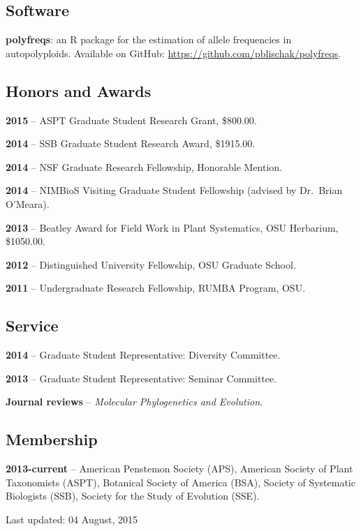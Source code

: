 \documentclass[]{article}
\begin{document}
\subsection{\texorpdfstring{\textbf{Software}}{Software}}\label{software}

\textbf{polyfreqs}: an R package for the estimation of allele
frequencies in autopolyploids. Available on GitHub:
\href{https://github.com/pblischak/polyfreqs}{\url{https://github.com/pblischak/polyfreqs}}.

\subsection{\texorpdfstring{\textbf{Honors and
Awards}}{Honors and Awards}}\label{honors-and-awards}

\textbf{2015} -- ASPT Graduate Student Research Grant, \$800.00.

\textbf{2014} -- SSB Graduate Student Research Award, \$1915.00.

\textbf{2014} -- NSF Graduate Research Fellowship, Honorable Mention.

\textbf{2014} -- NIMBioS Visiting Graduate Student Fellowship (advised
by Dr.~Brian O'Meara).

\textbf{2013} -- Beatley Award for Field Work in Plant Systematics, OSU
Herbarium, \$1050.00.

\textbf{2012} -- Distinguished University Fellowship, OSU Graduate
School.

\textbf{2011} -- Undergraduate Research Fellowship, RUMBA Program, OSU.

\subsection{\texorpdfstring{\textbf{Service}}{Service}}\label{service}

\textbf{2014} -- Graduate Student Representative: Diversity Committee.

\textbf{2013} -- Graduate Student Representative: Seminar Committee.

\textbf{Journal reviews} -- \emph{Molecular Phylogenetics and
Evolution}.

\subsection{\texorpdfstring{\textbf{Membership}}{Membership}}\label{membership}

\textbf{2013-current} -- American Penstemon Society (APS), American
Society of Plant Taxonomists (ASPT), Botanical Society of America (BSA),
Society of Systematic Biologists (SSB), Society for the Study of
Evolution (SSE).

\begin{center}
Last updated: 04 August, 2015
\end{center}
\end{document}

